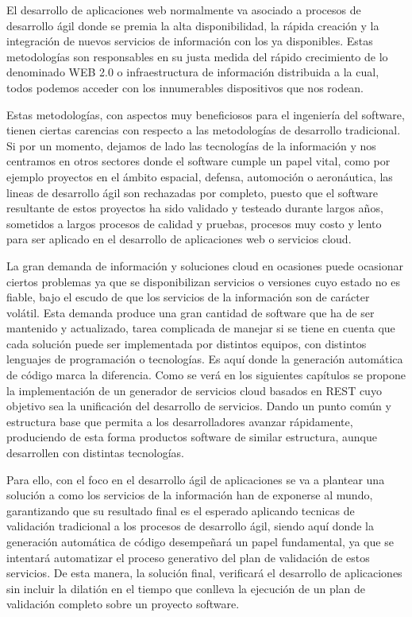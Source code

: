 \documentclass[a4paper,11pt]{book}
\begin{document}
El desarrollo de aplicaciones web normalmente va asociado a procesos de desarrollo ágil donde se premia la alta disponibilidad, la rápida creación y la integración de nuevos servicios de información con los ya disponibles. Estas metodologías son responsables en su justa medida del rápido crecimiento de lo denominado WEB 2.0 o infraestructura de información distribuida a la cual, todos podemos acceder con los innumerables dispositivos que nos rodean. 

Estas metodologías, con aspectos muy beneficiosos para el ingeniería del software, tienen ciertas carencias con respecto a las metodologías de desarrollo tradicional. Si por un momento, dejamos de lado las tecnologías de la información y nos centramos en otros sectores  donde el software cumple un papel vital, como por ejemplo proyectos en el ámbito espacial, defensa, automoción o aeronáutica, las lineas de desarrollo ágil son rechazadas por completo, puesto que el software resultante de estos proyectos ha sido validado y testeado durante largos años, sometidos a  largos procesos de calidad y pruebas, procesos muy costo y lento para ser aplicado en el desarrollo de aplicaciones web o servicios cloud. 

La gran demanda de información y soluciones cloud en ocasiones puede ocasionar ciertos problemas ya que se disponibilizan servicios o versiones cuyo estado no es fiable, bajo el escudo de que los servicios de la información son de carácter volátil.  Esta demanda produce una gran cantidad de software que ha de ser mantenido y actualizado, tarea complicada de manejar si se tiene en cuenta que cada solución puede ser implementada por  distintos equipos, con distintos lenguajes de programación o tecnologías.  Es aquí donde la generación automática de código marca la diferencia. Como se verá en los siguientes capítulos se propone la implementación de un generador de servicios cloud basados en REST cuyo objetivo sea la unificación del desarrollo de servicios. Dando un punto común y estructura base que permita a los desarrolladores avanzar rápidamente, produciendo de esta forma productos software de similar estructura, aunque desarrollen con distintas tecnologías. 



Para ello, con el foco en el desarrollo ágil de aplicaciones se va a plantear una solución a como los servicios de la información han de exponerse al mundo, garantizando que su resultado final es el esperado aplicando tecnicas de validación tradicional a los procesos de desarrollo ágil, siendo aquí donde la generación automática de código desempeñará un papel fundamental, ya que se intentará automatizar el proceso generativo del plan de validación de estos servicios. De esta manera, la solución final, verificará el desarrollo de aplicaciones sin incluir la dilatión en el tiempo que conlleva la ejecución de un plan de validación completo sobre un proyecto software.    
\end{document}
